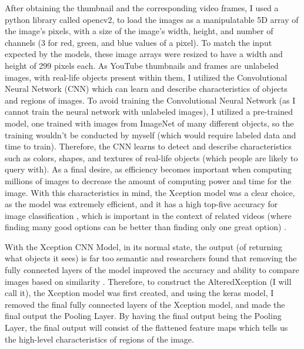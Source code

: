 \documentclass[10pt,twocolumn]{article}
\begin{document}
After obtaining the thumbnail and the corresponding video frames, I used a python library called opencv2, to load the images as a manipulatable 5D array of the image's pixels, with a size of the image's width, height, and number of channels (3 for red, green, and blue values of a pixel). To match the input expected by the models, these image arrays were resized to have a width and height of 299 pixels each. As YouTube thumbnails and frames are unlabeled images, with real-life objects present within them, I utilized the Convolutional Neural Network (CNN) which can learn and describe characteristics of objects and regions of images. To avoid training the Convolutional Neural Network (as I cannot train the neural network with unlabeled images), I utilized a pre-trained model, one trained with images from ImageNet of many different objects, so the training wouldn't be conducted by myself (which would require labeled data and time to train). Therefore, the CNN learns to detect and describe characteristics such as colors, shapes, and textures of real-life objects (which people are likely to query with). As a final desire, as efficiency becomes important when computing millions of images to decrease the amount of computing power and time for the image. With this characteristics in mind, the Xception model was a clear choice, as the model was extremely efficient, and it has a high top-five accuracy for image classification \cite{CITE HERE}, which is important in the context of related videos (where finding many good options can be better than finding only one great option) \cite{Stancic2022}. 

With the Xception CNN Model, in its normal state, the output (of returning what objects it sees) is far too semantic and researchers found that removing the fully connected layers of the model improved the accuracy and ability to compare images based on similarity \cite{CITE HERE}. Therefore, to construct the AlteredXception (I will call it), the Xception model was first created, and using the keras model, I removed the final fully connected layers of the Xception model, and made the final output the Pooling Layer. By having the final output being the Pooling Layer, the final output will consist of the flattened feature maps which tells us the high-level characteristics of regions of the image.
\end{document}
